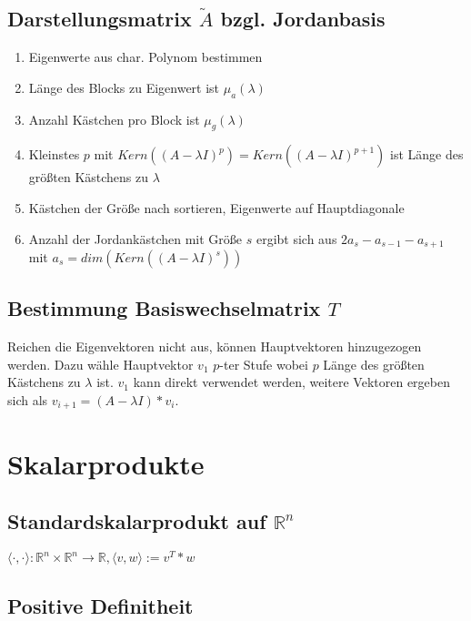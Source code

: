\subsection*{Darstellungsmatrix $\tilde A$ bzgl. Jordanbasis}

\begin{enumerate}[leftmargin=4mm]
	\item Eigenwerte aus char. Polynom bestimmen
	\item Länge des Blocks zu Eigenwert ist $\mu_a(\lambda)$
	\item Anzahl Kästchen pro Block ist $\mu_g(\lambda)$
	\item Kleinstes $p$ mit $Kern((A-\lambda I)^p) = Kern((A-\lambda I)^{p+1})$ ist Länge des größten Kästchens zu $\lambda$
	\item Kästchen der Größe nach sortieren, Eigenwerte auf Hauptdiagonale
	\item Anzahl der Jordankästchen mit Größe $s$ ergibt sich aus $2a_s - a_{s-1} - a_{s+1}$ mit $a_s = dim(Kern((A-\lambda I)^s))$
\end{enumerate}

\subsection*{Bestimmung Basiswechselmatrix $T$}

Reichen die Eigenvektoren nicht aus, können Hauptvektoren hinzugezogen werden. Dazu wähle Hauptvektor $v_1$ $p$-ter Stufe wobei $p$ Länge des größten Kästchens zu $\lambda$ ist. $v_1$ kann direkt verwendet werden, weitere Vektoren ergeben sich als $v_{i+1} = (A-\lambda I)*v_i$.

\section*{Skalarprodukte}

\subsection*{Standardskalarprodukt auf $\mathbb{R}^n$}

$\langle \cdot, \cdot \rangle : \mathbb{R}^n \times \mathbb{R}^n \rightarrow \mathbb{R}, \langle v, w \rangle := v^T * w$

\subsection*{Positive Definitheit}

